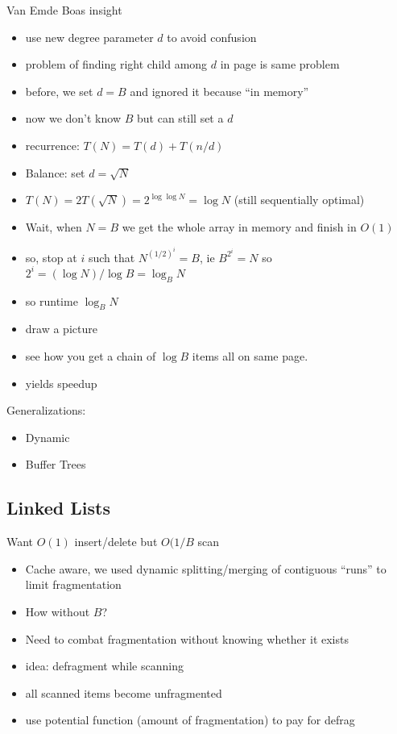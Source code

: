 \documentclass{article}
\begin{document}
Van Emde Boas insight
\begin{itemize}
\item use new degree parameter $d$ to avoid confusion
\item problem of finding right child among $d$ in page is same problem
\item before, we set $d=B$ and ignored it because ``in memory''
\item now we don't know $B$ but can still set a $d$
\item recurrence: $T(N) = T(d) + T(n/d)$
\item Balance: set $d=\sqrt{N}$
\item $T(N) = 2T(\sqrt{N}) = 2^{\log\log N} = \log N$ (still
  sequentially optimal)
\item Wait, when $N=B$ we get the whole array in memory and finish in
  $O(1)$
\item so, stop at $i$ such that $N^{(1/2)^i}=B$, ie $B^{2^i}=N$ so $2^i
  = (\log N)/\log B =\log_B N$
\item so runtime $\log_B N$
\item draw a picture
\item see how you get a chain of $\log B$ items all on
  same page.
\item yields speedup
\end{itemize}

Generalizations:
\begin{itemize}
\item Dynamic
\item Buffer Trees
\end{itemize}

\subsection*{Linked Lists}

Want $O(1)$ insert/delete but $O(1/B$ scan
\begin{itemize}
\item Cache aware, we used dynamic splitting/merging of contiguous ``runs''
to limit fragmentation
\item How without $B$?
\item Need to combat fragmentation without knowing whether it exists
\item idea: defragment while scanning
\item all scanned items become unfragmented
\item use potential function (amount of fragmentation) to pay for
  defrag
\end{itemize}
\end{document}
